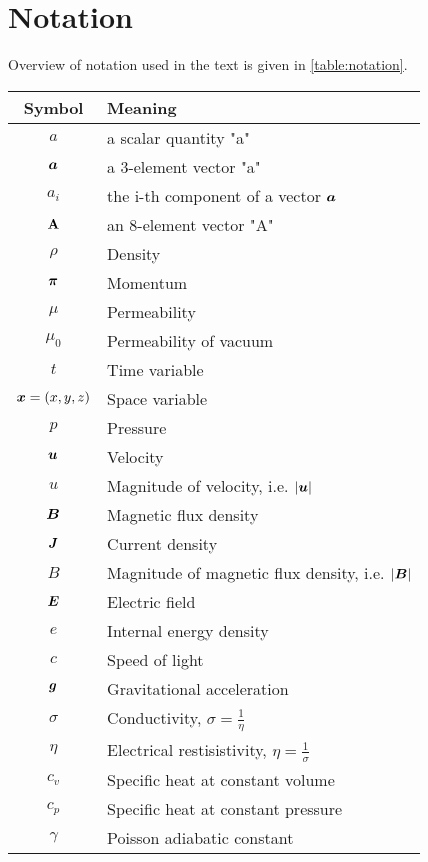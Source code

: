 \section*{Notation}
Overview of notation used in the text is given in \cref{table:notation}.
\begin{table}[H]
    \centering
    \begin{tabular}{ |c|l| } 
        \hline
        Symbol & Meaning \\ 
        \hline
        $a$ & a scalar quantity "a"\\
        $\mbox{\boldmath $a$}$ & a 3-element vector "a"\\
        $a_i$ & the i-th component of a vector $\mbox{\boldmath $a$}$ \\
        $\mathrm{\mathbf{A}}$ & an 8-element vector "A" \\
        \hline
        $\rho$ & Density \\ 
        $\mbox{\boldmath $\pi$}$ & Momentum \\ 
        $\mu$ & Permeability \\ 
        $\mu_0$ & Permeability of vacuum\\ 
        $t$ & Time variable\\ 
        $\mbox{\boldmath $x$} = \left( x, y, z\right)$ & Space variable \\ 
        $p$ & Pressure \\ 
        $\mbox{\boldmath $u$}$ & Velocity \\ 
        $u$ & Magnitude of velocity, i.e. $|\mbox{\boldmath $u$}|$ \\ 
        $\mbox{\boldmath $B$}$ & Magnetic flux density \\ 
        $\mbox{\boldmath $J$}$ & Current density\\ 
        $B$ & Magnitude of magnetic flux density, i.e. $|\mbox{\boldmath $B$}|$ \\ 
        $\mbox{\boldmath $E$}$ & Electric field\\ 
        $e$ & Internal energy density \\ 
        $c$ & Speed of light\\ 
        $\mbox{\boldmath $g$}$ & Gravitational acceleration\\ 
        $\sigma$ & Conductivity, $\sigma = \frac{1}{\eta}$\\ 
        $\eta$ & Electrical restisistivity, $\eta = \frac{1}{\sigma}$\\
        $c_v$ & Specific heat at constant volume\\
        $c_p$ & Specific heat at constant pressure\\
        $\gamma$ & Poisson adiabatic constant\\

\end{tabular}
\end{table}
